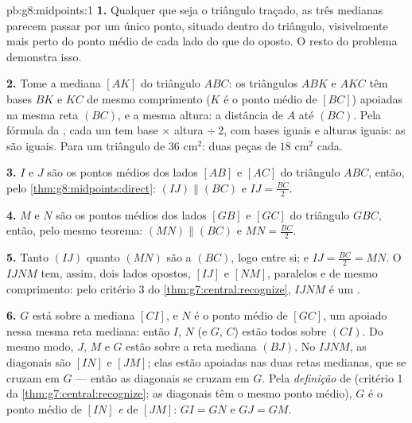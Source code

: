 \begin{solution}{pb:g8:midpoints:1}
\textbf{1.} Qualquer que seja o triângulo traçado, as três medianas
parecem passar por um único ponto, situado dentro do triângulo,
visivelmente mais perto do ponto médio de cada lado do que do 
oposto. O resto do problema demonstra isso.

\textbf{2.} Tome a mediana $[AK]$ do triângulo $ABC$: os triângulos
$ABK$ e $AKC$ têm bases $BK$ e $KC$ de mesmo comprimento ($K$ é o ponto
médio de $[BC]$) apoiadas na mesma reta $(BC)$, e a mesma altura: a
distância de $A$ até $(BC)$. Pela fórmula da , cada um tem 
base $\times$ altura $\div\ 2$, com bases iguais e alturas iguais: as
 são iguais. Para um triângulo de  $36$ cm$^2$: duas peças de
$18$ cm$^2$ cada.

\textbf{3.} $I$ e $J$ são os pontos médios dos lados $[AB]$ e $[AC]$ do
triângulo $ABC$, então, pelo \cref{thm:g8:midpoints:direct}:
$(IJ) \parallel (BC)$ e $IJ = \frac{BC}{2}$.

\textbf{4.} $M$ e $N$ são os pontos médios dos lados $[GB]$ e $[GC]$ do
triângulo $GBC$, então, pelo mesmo teorema: $(MN) \parallel (BC)$ e
$MN = \frac{BC}{2}$.

\textbf{5.} Tanto $(IJ)$ quanto $(MN)$ são  a $(BC)$, logo
 entre si; e $IJ = \frac{BC}{2} = MN$. O  $IJNM$
tem, assim, dois lados opostos, $[IJ]$ e $[NM]$, paralelos e de mesmo
comprimento: pelo critério 3 do \cref{thm:g7:central:recognize},
$IJNM$ é um .

\textbf{6.} $G$ está sobre a mediana $[CI]$, e $N$ é o ponto médio de
$[GC]$, um  apoiado nessa mesma reta mediana: então $I$, $N$ (e
$G$, $C$) estão todos sobre $(CI)$. Do mesmo modo, $J$, $M$ e $G$ estão
sobre a reta mediana $(BJ)$. No  $IJNM$, as diagonais são
$[IN]$ e $[JM]$; elas estão apoiadas nas duas retas medianas, que se
cruzam em $G$ --- então as diagonais se cruzam em $G$. Pela
\emph{definição} de  (critério 1 da
\cref{thm:g7:central:recognize}: as diagonais têm o mesmo ponto médio),
$G$ é o ponto médio de $[IN]$ \emph{e} de $[JM]$: $GI = GN$ e
$GJ = GM$.


\end{solution}
